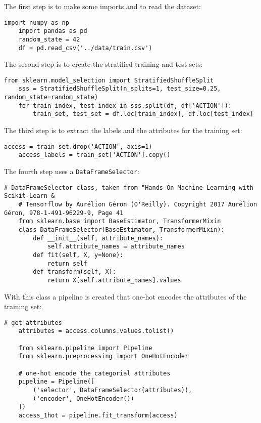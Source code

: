 \documentclass[11pt]{article}
\begin{document}
The first step is to make some imports and to read the dataset:
\begin{lstlisting}[frame=single]
    import numpy as np
    import pandas as pd
    random_state = 42
    df = pd.read_csv('../data/train.csv')
\end{lstlisting}
    
The second step is to create the stratified training and test sets:

\begin{lstlisting}[frame=single]
    from sklearn.model_selection import StratifiedShuffleSplit
    sss = StratifiedShuffleSplit(n_splits=1, test_size=0.25, random_state=random_state)
    for train_index, test_index in sss.split(df, df['ACTION']):
        train_set, test_set = df.loc[train_index], df.loc[test_index]
\end{lstlisting}

The third step is to extract the labels and the attributes for the training set:

\begin{lstlisting}[frame=single]
    access = train_set.drop('ACTION', axis=1)
    access_labels = train_set['ACTION'].copy()
\end{lstlisting}

The fourth step uses a {\tt DataFrameSelector}:

\begin{lstlisting}[frame=single]
    # DataFrameSelector class, taken from "Hands-On Machine Learning with Scikit-Learn & 
    # Tensorflow by Aurélion Géron (O'Reilly). Copyright 2017 Aurélion Géron, 978-1-491-96229-9, Page 41
    from sklearn.base import BaseEstimator, TransformerMixin
    class DataFrameSelector(BaseEstimator, TransformerMixin):
        def __init__(self, attribute_names):
            self.attribute_names = attribute_names
        def fit(self, X, y=None):
            return self
        def transform(self, X):
            return X[self.attribute_names].values
\end{lstlisting}

With this class a pipeline is created that one-hot encodes the attributes of the 
training set:

\begin{lstlisting}[frame=single]
    # get attributes
    attributes = access.columns.values.tolist()

    from sklearn.pipeline import Pipeline
    from sklearn.preprocessing import OneHotEncoder

    # one-hot encode the categorial attributes
    pipeline = Pipeline([
        ('selector', DataFrameSelector(attributes)),
        ('encoder', OneHotEncoder())
    ])
    access_1hot = pipeline.fit_transform(access)
\end{lstlisting}
\end{document}
